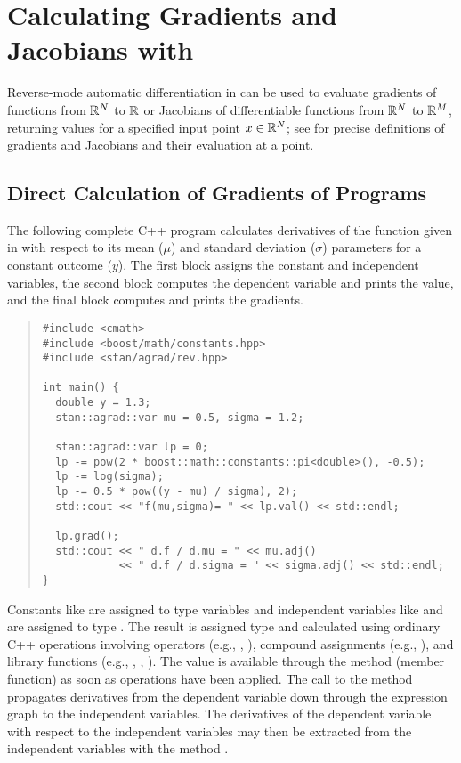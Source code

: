 \documentclass[10pt]{article}
\begin{document}
\section{Calculating Gradients and Jacobians with }

Reverse-mode automatic differentiation in  can be
used to evaluate gradients of functions from $\mathbb{R}^N$ to $\mathbb{R}$ or
Jacobians of differentiable functions from $\mathbb{R}^N$ to $\mathbb{R}^M$,
returning values for a specified input point $x \in \mathbb{R}^N$; see
 for precise definitions of
gradients and Jacobians and their evaluation at a point.

\subsection{Direct Calculation of Gradients of Programs}

The following complete C++ program calculates derivatives of the
function given in  with respect to its mean
($\mu$) and standard deviation ($\sigma$) parameters for a constant
outcome ($y$).  The first block assigns the constant and independent
variables, the second block computes the dependent variable and prints
the value, and the final block computes and prints the gradients.
%
\begin{quote}
\begin{Verbatim}
#include <cmath>
#include <boost/math/constants.hpp>
#include <stan/agrad/rev.hpp>

int main() { 
  double y = 1.3;
  stan::agrad::var mu = 0.5, sigma = 1.2;

  stan::agrad::var lp = 0;
  lp -= pow(2 * boost::math::constants::pi<double>(), -0.5);
  lp -= log(sigma);
  lp -= 0.5 * pow((y - mu) / sigma), 2);
  std::cout << "f(mu,sigma)= " << lp.val() << std::endl;

  lp.grad();
  std::cout << " d.f / d.mu = " << mu.adj()
            << " d.f / d.sigma = " << sigma.adj() << std::endl;
}
\end{Verbatim}
\end{quote}
%
Constants like  are assigned to type  variables
and independent variables like  and  are assigned
to type .  The result  is assigned type 
and calculated using ordinary C++ operations involving operators
(e.g., \code{*}, \code{/}), compound assignments (e.g., \code{-=}),
and library functions (e.g., , , ).  The
value is available through the method (member function)  as soon as
operations have been applied.  The call to the method
 propagates derivatives from the dependent variable
 down through the expression graph to the independent
variables.  The derivatives of the dependent variable with respect to
the independent variables may then be extracted from the independent
variables with the method .
\end{document}
